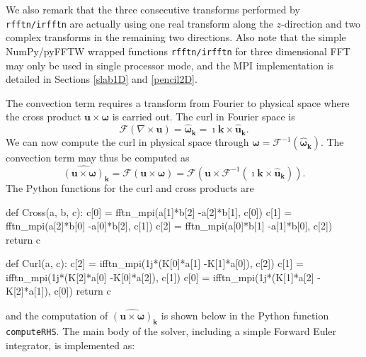 \documentclass[final,3p,times,twocolumn]{elsarticle}
\newcommand{\inpyth}{\lstinline[style=inlinestyle]} %[]%
\newcounter{bla}
\begin{document}
We also remark that the three consecutive transforms performed by 
\inpyth{rfftn/irfftn} are actually using one real transform along the 
$z$-direction and two complex transforms in the remaining two directions. Also 
note that the simple NumPy/pyFFTW wrapped functions \inpyth{rfftn/irfftn} for 
three dimensional FFT may only be used in single processor mode, and the MPI 
implementation is detailed in Sections
\ref{slab1D} and \ref{pencil2D}.

The convection term requires a transform from Fourier to physical space where the cross product $\bm{u} \times \bm{\omega}$ is carried out. The curl in Fourier space is
\begin{equation}
\mathcal{F}(\nabla \times \bm{u}) = \hat{\bm{\omega}}_{\bm{k}} = \imath \bm{k} \times \hat{\bm{u}}_{\bm{k}}.
\end{equation}
We can now compute the curl in physical space through $\bm{\omega} = \mathcal{F}^{-1}(\hat{\bm{\omega}}_{\bm{k}})$. The convection term may thus be computed as
\begin{equation}
\widehat{( \bm{u} \times \bm{\omega})}_{\bm{k}} = \mathcal{F}(\bm{u} \times \bm{\omega}) = \mathcal{F} (\bm{u} \times \mathcal{F}^{-1}(\imath \bm{k} \times \hat{\bm{u}}_{\bm{k}})).
\label{eq:curl_convection}
\end{equation}
The Python functions for the curl and cross products are

\begin{python}
def Cross(a, b, c):
    c[0] = fftn_mpi(a[1]*b[2]
                   -a[2]*b[1], c[0])
    c[1] = fftn_mpi(a[2]*b[0]
                   -a[0]*b[2], c[1])
    c[2] = fftn_mpi(a[0]*b[1]
                   -a[1]*b[0], c[2])
    return c

def Curl(a, c):
    c[2] = ifftn_mpi(1j*(K[0]*a[1]
                        -K[1]*a[0]), c[2])
    c[1] = ifftn_mpi(1j*(K[2]*a[0]
                        -K[0]*a[2]), c[1])
    c[0] = ifftn_mpi(1j*(K[1]*a[2]
                        -K[2]*a[1]), c[0])
    return c

\end{python}
and the computation of $\widehat{( \bm{u} \times \bm{\omega})}_{\bm{k}}$ is 
shown below in the Python function \inpyth{computeRHS}. The main body of the 
solver, including a simple Forward Euler integrator, is implemented as:
\end{document}
